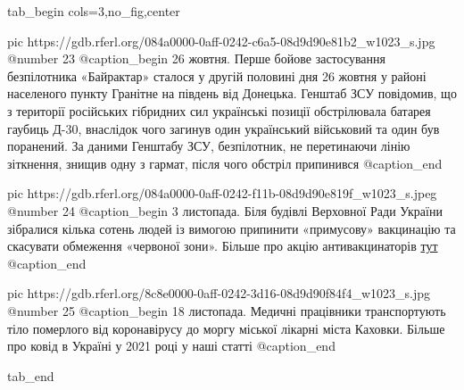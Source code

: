  
 
 
 
 

\ifcmt
  tab_begin cols=3,no_fig,center

     pic https://gdb.rferl.org/084a0000-0aff-0242-c6a5-08d9d90e81b2_w1023_s.jpg
		 @number 23
		 @caption_begin
26 жовтня. Перше бойове застосування безпілотника «Байрактар» сталося у другій
половині дня 26 жовтня у районі населеного пункту Гранітне на південь від
Донецька. Генштаб ЗСУ повідомив, що з території російських гібридних сил
українські позиції обстрілювала батарея гаубиць Д-30, внаслідок чого загинув
один український військовий та один був поранений. За даними Генштабу ЗСУ,
безпілотник, не перетинаючи лінію зіткнення, знищив одну з гармат, після чого
обстріл припинився
		 @caption_end

		 pic https://gdb.rferl.org/084a0000-0aff-0242-f11b-08d9d90e819f_w1023_s.jpeg
		 @number 24
		 @caption_begin
3 листопада. Біля будівлі Верховної Ради України зібралися кілька сотень людей
із вимогою припинити «примусову» вакцинацію та скасувати обмеження «червоної
зони». Більше про акцію антивакцинаторів
\href{https://www.radiosvoboda.org/a/antyvakcynatory-zibralysia-pid-parlamentom-foto/31544278.html}{тут}
		 @caption_end

		 pic https://gdb.rferl.org/8c8e0000-0aff-0242-3d16-08d9d90f84f4_w1023_s.jpg
		 @number 25
		 @caption_begin
18 листопада. Медичні працівники транспортують тіло померлого від коронавірусу
до моргу міської лікарні міста Каховки. Більше про ковід в Україні у 2021 році
у наші статті
		 @caption_end

  tab_end
\fi
